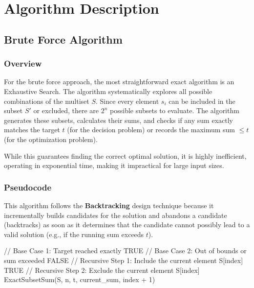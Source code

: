 \documentclass[12pt,a4paper]{article}
\begin{document}
\section{Algorithm Description}

\subsection{Brute Force Algorithm}

\subsubsection{Overview}
For the brute force approach, the most straightforward exact algorithm is an Exhaustive Search. The algorithm systematically explores all possible combinations of the multiset $S$. Since every element $s_i$ can be included in the subset $S'$ or excluded, there are $2^n$ possible subsets to evaluate. The algorithm generates these subsets, calculates their sums, and checks if any sum exactly matches the target $t$ (for the decision problem) or records the maximum sum $\leq t$ (for the optimization problem).

While this guarantees finding the correct optimal solution, it is highly inefficient, operating in exponential time, making it impractical for large input sizes.

\subsubsection{Pseudocode}
This algorithm follows the \textbf{Backtracking} design technique because it incrementally builds candidates for the solution and abandons a candidate (backtracks) as soon as it determines that the candidate cannot possibly lead to a valid solution (e.g., if the running sum exceeds $t$).

\begin{algorithm}[H]
\caption{ExactSubsetSum(S, n, t, current\_sum, index)}
\begin{algorithmic}
\STATE // Base Case 1: Target reached exactly
    \RETURN TRUE
\ENDIF
\STATE // Base Case 2: Out of bounds or sum exceeded
    \RETURN FALSE
\ENDIF
\STATE // Recursive Step 1: Include the current element S[index]
    \RETURN TRUE
\ENDIF
\STATE // Recursive Step 2: Exclude the current element S[index]
\RETURN ExactSubsetSum(S, n, t, current\_sum, index + 1)
\end{algorithmic}
\end{algorithm}
\end{document}
